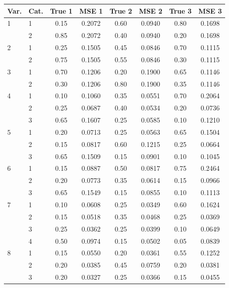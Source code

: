 \begin{table}[H]
\centering
\begin{tabular}{llcccccc}
  \toprule
\textbf{Var.} & \textbf{Cat.} & \textbf{True 1} & \textbf{MSE 1} & \textbf{True 2} & \textbf{MSE 2} & \textbf{True 3} & \textbf{MSE 3} \\ 
  \midrule
1 & 1 & 0.15 & 0.2072 & 0.60 & 0.0940 & 0.80 & 0.1698 \\ 
   & 2 & 0.85 & 0.2072 & 0.40 & 0.0940 & 0.20 & 0.1698 \\ 
  2 & 1 & 0.25 & 0.1505 & 0.45 & 0.0846 & 0.70 & 0.1115 \\ 
   & 2 & 0.75 & 0.1505 & 0.55 & 0.0846 & 0.30 & 0.1115 \\ 
  3 & 1 & 0.70 & 0.1206 & 0.20 & 0.1900 & 0.65 & 0.1146 \\ 
   & 2 & 0.30 & 0.1206 & 0.80 & 0.1900 & 0.35 & 0.1146 \\ 
  4 & 1 & 0.10 & 0.1060 & 0.35 & 0.0551 & 0.70 & 0.2064 \\ 
   & 2 & 0.25 & 0.0687 & 0.40 & 0.0534 & 0.20 & 0.0736 \\ 
   & 3 & 0.65 & 0.1607 & 0.25 & 0.0585 & 0.10 & 0.1210 \\ 
  5 & 1 & 0.20 & 0.0713 & 0.25 & 0.0563 & 0.65 & 0.1504 \\ 
   & 2 & 0.15 & 0.0817 & 0.60 & 0.1215 & 0.25 & 0.0664 \\ 
   & 3 & 0.65 & 0.1509 & 0.15 & 0.0901 & 0.10 & 0.1045 \\ 
  6 & 1 & 0.15 & 0.0887 & 0.50 & 0.0817 & 0.75 & 0.2464 \\ 
   & 2 & 0.20 & 0.0773 & 0.35 & 0.0614 & 0.15 & 0.0966 \\ 
   & 3 & 0.65 & 0.1549 & 0.15 & 0.0855 & 0.10 & 0.1113 \\ 
  7 & 1 & 0.10 & 0.0608 & 0.25 & 0.0349 & 0.60 & 0.1624 \\ 
   & 2 & 0.15 & 0.0518 & 0.35 & 0.0468 & 0.25 & 0.0369 \\ 
   & 3 & 0.25 & 0.0362 & 0.25 & 0.0399 & 0.10 & 0.0649 \\ 
   & 4 & 0.50 & 0.0974 & 0.15 & 0.0502 & 0.05 & 0.0839 \\ 
  8 & 1 & 0.15 & 0.0550 & 0.20 & 0.0361 & 0.55 & 0.1252 \\ 
   & 2 & 0.20 & 0.0385 & 0.45 & 0.0759 & 0.20 & 0.0381 \\ 
   & 3 & 0.20 & 0.0327 & 0.25 & 0.0366 & 0.15 & 0.0455 \\ 

\end{tabular}
\end{table}
